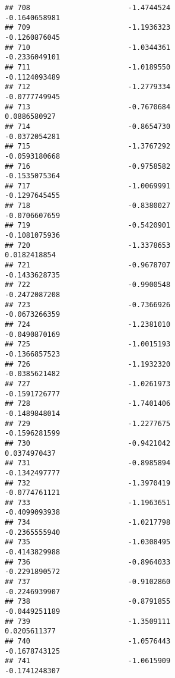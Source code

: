 \documentclass[
]{article}
\begin{document}
\begin{verbatim}
## 708                       -1.4744524                         -0.1640658981
## 709                       -1.1936323                         -0.1260876045
## 710                       -1.0344361                         -0.2336049101
## 711                       -1.0189550                         -0.1124093489
## 712                       -1.2779334                         -0.0777749945
## 713                       -0.7670684                          0.0886580927
## 714                       -0.8654730                         -0.0372054281
## 715                       -1.3767292                         -0.0593180668
## 716                       -0.9758582                         -0.1535075364
## 717                       -1.0069991                         -0.1297645455
## 718                       -0.8380027                         -0.0706607659
## 719                       -0.5420901                         -0.1081075936
## 720                       -1.3378653                          0.0182418854
## 721                       -0.9678707                         -0.1433628735
## 722                       -0.9900548                         -0.2472087208
## 723                       -0.7366926                         -0.0673266359
## 724                       -1.2381010                         -0.0490870169
## 725                       -1.0015193                         -0.1366857523
## 726                       -1.1932320                         -0.0385621482
## 727                       -1.0261973                         -0.1591726777
## 728                       -1.7401406                         -0.1489848014
## 729                       -1.2277675                         -0.1596281599
## 730                       -0.9421042                          0.0374970437
## 731                       -0.8985894                         -0.1342497777
## 732                       -1.3970419                         -0.0774761121
## 733                       -1.1963651                         -0.4099093938
## 734                       -1.0217798                         -0.2365555940
## 735                       -1.0308495                         -0.4143829988
## 736                       -0.8964033                         -0.2291890572
## 737                       -0.9102860                         -0.2246939907
## 738                       -0.8791855                         -0.0449251189
## 739                       -1.3509111                          0.0205611377
## 740                       -1.0576443                         -0.1678743125
## 741                       -1.0615909                         -0.1741248307

\end{verbatim}
\end{document}
